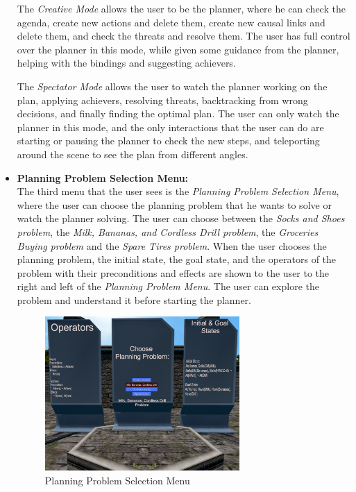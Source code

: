 \begin{itemize}
          The \textit{Creative Mode} allows the user to be the planner, where he can check the agenda, create new actions and delete them, create new causal links and delete them, and check the threats and resolve them. The user has full control over the planner in this mode, while given some guidance from the planner, helping with the bindings and suggesting achievers.

          The \textit{Spectator Mode} allows the user to watch the planner working on the plan, applying achievers, resolving threats, backtracking from wrong decisions, and finally finding the optimal plan. The user can only watch the planner in this mode, and the only interactions that the user can do are starting or pausing the planner to check the new steps, and teleporting around the scene to see the plan from different angles.

    \item \textbf{Planning Problem Selection Menu:} \\
          The third menu that the user sees is the \textit{Planning Problem Selection Menu}, where the user can choose the planning problem that he wants to solve or watch the planner solving. The user can choose between the \textit{Socks and Shoes problem}, the \textit{Milk, Bananas, and Cordless Drill problem}, the \textit{Groceries Buying problem} and the \textit{Spare Tires problem}. When the user chooses the planning problem, the initial state, the goal state, and the operators of the problem with their preconditions and effects are shown to the user to the right and left of the \textit{Planning Problem Menu}. The user can explore the problem and understand it before starting the planner.

          \begin{figure}[H]
              \centering
              \includegraphics[width=0.7\textwidth]{images/planning_problem.png}
              \caption[Planning Problem Selection Menu in VR]{Planning Problem Selection Menu}
              \label{fig:vr_problem_selection_menu}
          \end{figure}


\end{itemize}

